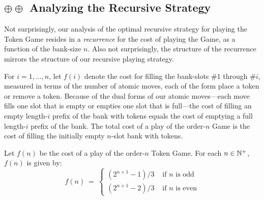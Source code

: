 \subsection{$\oplus \oplus$ Analyzing the Recursive Strategy}
\label{sec:analysis-of-Token-Game}

Not surprisingly, our analysis of the optimal recursive strategy for playing the Token Game resides in a {\em recurrence} for the cost of playing the Game, as a function of the bank-size $n$.  Also not surprisingly, the structure of the recurrence mirrors the structure of our recursive playing strategy.

\medskip

For $i = 1, \ldots, n$, let $f(i)$ denote the cost for filling the bank-slots \#$1$ through \#$i$, measured in terms of the number of atomic moves, each of the form {\sc place a token} or {\sc remove a token}.  Because of the dual forms of our atomic moves---each move fills one slot that is empty or empties one slot that is full---the cost of filling an empty length-$i$ prefix of the bank with tokens equals the cost of emptying a full length-$i$ prefix of the bank.  The total cost of a play of the order-$n$ Game is the cost of filling the initially empty $n$-slot bank with tokens.

\begin{prop}
\label{thm:f-cost of TokenGame}
Let $f(n)$ be the cost of a play of the order-$n$ Token Game.  For each $n \in \mathbb{N}^+$, $f(n)$ is given by:
\begin{equation}
\label{eq:f-cost:Token-Game}
f(n) \ = \ \left\{
\begin{array}{ll}
  \left( 2^{n+1} -1 \right)/3
         & \mbox{  if $n$ is odd} \\
  \left( 2^{n+1} -2 \right)/3
        & \mbox{  if $n$ is even}
\end{array}
\right.
\end{equation}
\end{prop}


